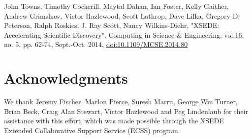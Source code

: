 \documentclass[onecolumn,9pt]{article}
\begin{document}
John Towns, Timothy Cockerill, Maytal Dahan, Ian Foster, Kelly Gaither, Andrew Grimshaw, Victor Hazlewood, Scott Lathrop, Dave Lifka, Gregory D. Peterson, Ralph Roskies, J. Ray Scott, Nancy Wilkins-Diehr, "XSEDE: Accelerating Scientific Discovery", Computing in Science \& Engineering, vol.16, no. 5, pp. 62-74, Sept.-Oct. 2014, \url{doi:10.1109/MCSE.2014.80}

\section{Acknowledgments}
\label{sec:orgheadline36}

We thank Jeremy Fischer, Marlon Pierce, Suresh Marru, George Wm Turner, Brian Beck, Craig Alan Stewart, Victor Hazlewood and Peg Lindenlaub for their assistance with this effort, which was made possible through the XSEDE Extended Collaborative Support Service (ECSS) program.
\end{document}
